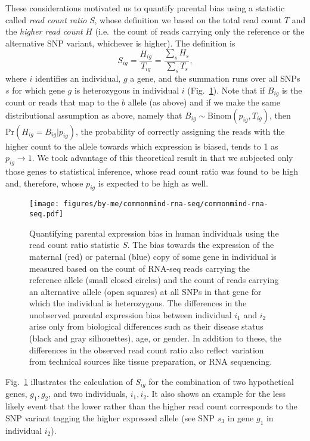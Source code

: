 \documentclass[letterpaper]{article}
\begin{document}
These considerations motivated us to quantify parental bias using a statistic called
\emph{read count ratio} \(S\), whose definition we
based on the total read count \(T\) and the \emph{higher read count} \(H\)
(i.e.~the count of reads carrying only the reference or the alternative SNP variant,
whichever is higher).  The
definition is
\begin{equation}
S_{ig} = \frac{H_{ig}}{T_{ig}}= \frac{\sum_s H_s}{\sum_sT_s},
\label{eq:S-definition}
\end{equation}
where \(i\) identifies an individual, \(g\) a gene, and the summation runs
over all SNPs \(s\) for which gene \(g\) is heterozygous in individual \(i\) (Fig.~\ref{fig:study-design}).
Note that if \(B_{ig}\) is the count or reads that map to the \(b\) allele (as
above) and if we make the same distributional assumption as above, namely that \(B_{ig}\sim
\mathrm{Binom}(p_{ig}, T_{ig})\), then \(\mathrm{Pr}(H_{ig}=B_{ig}|p_{ig})\), the probability of correctly
assigning the reads with the higher count to the allele towards which
expression is biased, tends to 1 as \(p_{ig} \rightarrow 1\).  We took
advantage of this theoretical result in that we subjected only those genes to
statistical inference, whose read count ratio was found to be high and,
therefore, whose \(p_{ig}\) is expected to be high as well.

\begin{figure} \begin{center}
\texttt{[image: figures/by-me/commonmind-rna-seq/commonmind-rna-seq.pdf]}
\end{center} \caption{ Quantifying parental expression bias in human
individuals using the read count ratio statistic \(S\).  The bias towards the
expression of the maternal (red) or paternal (blue) copy of some gene in
individual is measured based on the count of RNA-seq reads carrying the
reference allele (small closed circles) and the count of reads carrying an
alternative allele (open squares) at all SNPs in that gene for which the
individual is heterozygous.  The differences in the unobserved parental
expression bias between individual \(i_1\) and \(i_2\) arise only from
biological differences such as their disease status (black and gray
silhouettes), age, or gender.  In addition to these, the differences in the
observed read count ratio also reflect variation from technical sources like
tissue preparation, or RNA sequencing.  } \label{fig:study-design}
\end{figure}

Fig.~\ref{fig:study-design} illustrates the calculation of \(S_{ig}\) for the
combination of two hypothetical genes, \(g_1,g_2\), and two individuals,
\(i_1,i_2\).  It also shows an example for the less likely event that the lower rather
than the higher read count corresponds to the SNP variant tagging the higher
expressed allele (see SNP \(s_3\) in gene \(g_1\) in individual \(i_2\)).
\end{document}
